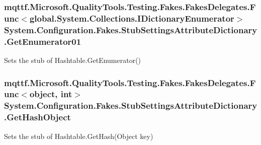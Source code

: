 \hypertarget{class_system_1_1_configuration_1_1_fakes_1_1_stub_settings_attribute_dictionary_aa0739446d9bfcf3cb2e8ae1465c09b3d}{
\subsubsection[{Get\-Enumerator01}]{\setlength{\rightskip}{0pt plus 5cm}mqttf.\-Microsoft.\-Quality\-Tools.\-Testing.\-Fakes.\-Fakes\-Delegates.\-Func$<$global.\-System.\-Collections.\-I\-Dictionary\-Enumerator$>$ System.\-Configuration.\-Fakes.\-Stub\-Settings\-Attribute\-Dictionary.\-Get\-Enumerator01}}\label{class_system_1_1_configuration_1_1_fakes_1_1_stub_settings_attribute_dictionary_aa0739446d9bfcf3cb2e8ae1465c09b3d}


Sets the stub of Hashtable.\-Get\-Enumerator()

\hypertarget{class_system_1_1_configuration_1_1_fakes_1_1_stub_settings_attribute_dictionary_a7d2d9a2db8e6f809b6ea826cfb5b563f}{
\subsubsection[{Get\-Hash\-Object}]{\setlength{\rightskip}{0pt plus 5cm}mqttf.\-Microsoft.\-Quality\-Tools.\-Testing.\-Fakes.\-Fakes\-Delegates.\-Func$<$object, int$>$ System.\-Configuration.\-Fakes.\-Stub\-Settings\-Attribute\-Dictionary.\-Get\-Hash\-Object}}\label{class_system_1_1_configuration_1_1_fakes_1_1_stub_settings_attribute_dictionary_a7d2d9a2db8e6f809b6ea826cfb5b563f}


Sets the stub of Hashtable.\-Get\-Hash(\-Object key)

